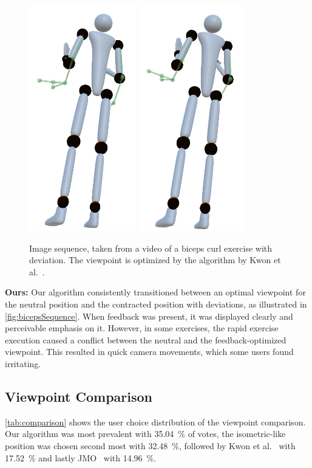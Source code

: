 \begin{figure}[h!]
	\includegraphics[width=0.12\linewidth]{pictures/kwonSequence7.png}\hfill
	\includegraphics[width=0.115\linewidth]{pictures/kwonSequence8.png}\hfill
	\caption[Image sequence optimized by Kwon et al.~\cite{kwon2020ocp}.]{Image sequence, taken from a video of a biceps curl exercise with deviation. The viewpoint is optimized by the algorithm by Kwon et al.~\cite{kwon2020ocp}.}
	\label{fig:kwonSequence}
\end{figure}

\textbf{Ours:}
Our algorithm consistently transitioned between an optimal viewpoint for the neutral position and the contracted position with deviations, as illustrated in \autoref{fig:bicepsSequence}. When feedback was present, it was displayed clearly and perceivable emphasis on it. However, in some exercises, the rapid exercise execution caused a conflict between the neutral and the feedback-optimized viewpoint. This resulted in quick camera movements, which some users found irritating.

\subsection{Viewpoint Comparison \label{sec:results:comparison}}
\autoref{tab:comparison} shows the user choice distribution of the viewpoint comparison. Our algorithm was most prevalent with 35.04~\% of votes, the isometric-like position was chosen second most with 32.48~\%, followed by Kwon et al.~\cite{kwon2020ocp} with 17.52~\% and lastly JMO~\cite{ishara2015mra} with 14.96~\%.


